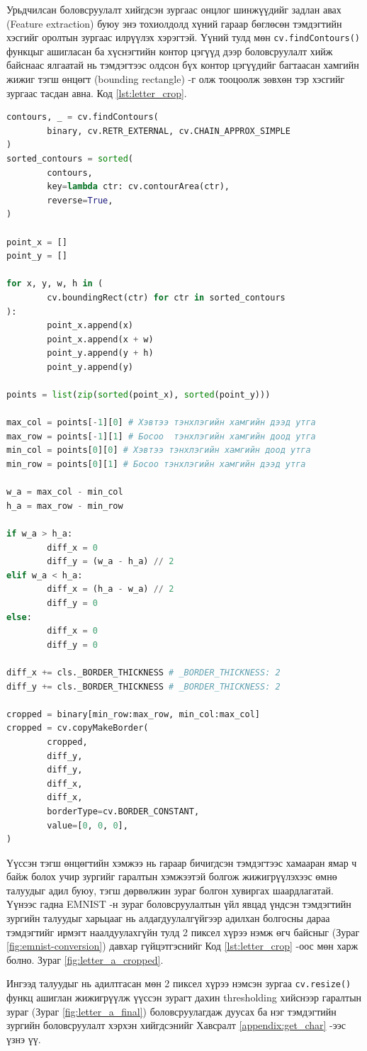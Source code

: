 Урьдчилсан боловсруулалт хийгдсэн зургаас онцлог шинжүүдийг задлан авах (Feature extraction) буюу энэ тохиолдолд хүний гараар бөглөсөн тэмдэгтийн хэсгийг оролтын зургаас илрүүлэх хэрэгтэй. Үүний тулд мөн \texttt{cv.findContours()} функцыг ашигласан ба хүснэгтийн контор цэгүүд дээр боловсруулалт хийж байснаас ялгаатай нь тэмдэгтээс олдсон бүх контор цэгүүдийг багтаасан хамгийн жижиг тэгш өнцөгт (bounding rectangle) -г олж тооцоолж зөвхөн тэр хэсгийг зургаас тасдан авна. Код \ref{lst:letter_crop}.

\begin{lstlisting}[caption={Тэмдэгтээс контор цэгүүдийг олж бүгдийг нь багтаасан хамгийн жижиг тэгш өнцөгтөөр тасдан авах}, label={lst:letter_crop}, language=Python]
contours, _ = cv.findContours(
		binary, cv.RETR_EXTERNAL, cv.CHAIN_APPROX_SIMPLE
)
sorted_contours = sorted(
		contours,
		key=lambda ctr: cv.contourArea(ctr),
		reverse=True,
)

point_x = []
point_y = []

for x, y, w, h in (
		cv.boundingRect(ctr) for ctr in sorted_contours
):
		point_x.append(x)
		point_x.append(x + w)
		point_y.append(y + h)
		point_y.append(y)

points = list(zip(sorted(point_x), sorted(point_y)))

max_col = points[-1][0] # Хэвтээ тэнхлэгийн хамгийн дээд утга
max_row = points[-1][1] # Босоо  тэнхлэгийн хамгийн доод утга
min_col = points[0][0] # Хэвтээ тэнхлэгийн хамгийн доод утга
min_row = points[0][1] # Босоо тэнхлэгийн хамгийн дээд утга

w_a = max_col - min_col
h_a = max_row - min_row

if w_a > h_a:
		diff_x = 0
		diff_y = (w_a - h_a) // 2
elif w_a < h_a:
		diff_x = (h_a - w_a) // 2
		diff_y = 0
else:
		diff_x = 0
		diff_y = 0

diff_x += cls._BORDER_THICKNESS # _BORDER_THICKNESS: 2
diff_y += cls._BORDER_THICKNESS # _BORDER_THICKNESS: 2

cropped = binary[min_row:max_row, min_col:max_col]
cropped = cv.copyMakeBorder(
		cropped,
		diff_y,
		diff_y,
		diff_x,
		diff_x,
		borderType=cv.BORDER_CONSTANT,
		value=[0, 0, 0],
)
\end{lstlisting}

Үүссэн тэгш өнцөгтийн хэмжээ нь гараар бичигдсэн тэмдэгтээс хамааран ямар ч байж болох учир зургийг гаралтын хэмжээтэй болгож жижигрүүлэхээс өмнө талуудыг адил буюу, тэгш дөрвөлжин зураг болгон хувиргах шаардлагатай. Үүнээс гадна EMNIST -н зураг боловсруулалтын үйл явцад үндсэн тэмдэгтийн зургийн талуудыг харьцааг нь алдагдуулалгүйгээр адилхан болгосны дараа тэмдэгтийг ирмэгт наалдуулахгүйн тулд 2 пиксел хүрээ нэмж өгч байсныг (Зураг \ref{fig:emnist-conversion}) давхар гүйцэтгэснийг Код \ref{lst:letter_crop} -оос мөн харж болно. Зураг \ref{fig:letter_a_cropped}.

Ингээд талуудыг нь адилтгасан мөн 2 пиксел хүрээ нэмсэн зургаа \texttt{cv.resize()} функц ашиглан жижигрүүлж үүссэн зурагт дахин thresholding хийснээр гаралтын зураг (Зураг \ref{fig:letter_a_final}) боловсруулагдаж дуусах ба нэг тэмдэгтийн зургийн боловсруулалт хэрхэн хийгдсэнийг Хавсралт \ref{appendix:get_char} -ээс үзнэ үү.
